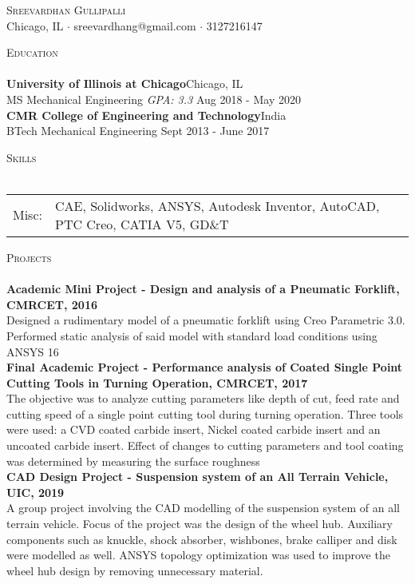 \documentclass[a4paper]{article}
\newcommand{\lineunder} {
    \vspace*{-8pt} \\
    \hspace*{-18pt} \hrulefill \\
}
\newcommand{\header} [1] {
    {\hspace*{-18pt}\vspace*{6pt} \textsc{#1}}
    \vspace*{-6pt} \lineunder
}
\begin{document}
\vspace*{-40pt}

    

\vspace*{-10pt}
\begin{center}
	{\Huge \scshape {Sreevardhan Gullipalli}}\\
	Chicago, IL $\cdot$ sreevardhang@gmail.com $\cdot$ 3127216147\\
\end{center}

\header{Education}
\textbf{University of Illinois at Chicago}\hfill Chicago, IL\\
MS Mechanical Engineering \textit{GPA: 3.3} \hfill Aug 2018 - May 2020\\
\vspace{2mm}
\textbf{CMR College of Engineering and Technology}\hfill India\\
BTech Mechanical Engineering \hfill Sept 2013 - June 2017\\
\vspace{2mm}



\header{Skills}
\begin{tabular}{ l l }
	Misc: & CAE, Solidworks, ANSYS, Autodesk Inventor, AutoCAD, PTC Creo, CATIA V5, GD\&T \\
\end{tabular}
\vspace{2mm}

\header{Projects}
{\textbf{Academic Mini Project - Design and analysis of a Pneumatic Forklift, CMRCET, 2016}}\\
Designed a rudimentary model of a pneumatic forklift using Creo Parametric 3.0. Performed static analysis of said model with standard load conditions using ANSYS 16\\
\vspace*{2mm}
{\textbf{Final Academic Project - Performance analysis of Coated Single Point Cutting Tools in Turning Operation, CMRCET, 2017}}\\
The objective was to analyze cutting parameters like depth of cut, feed rate and cutting speed of a single point cutting tool during turning operation. Three tools were used: a CVD coated carbide insert, Nickel coated carbide insert and an uncoated carbide insert. Effect of changes to cutting parameters and tool coating was determined by measuring the surface roughness\\
\vspace*{2mm}
{\textbf{CAD Design Project - Suspension system of an All Terrain Vehicle, UIC, 2019}}\\
A group project involving the CAD modelling of the suspension system of an all terrain vehicle. Focus of the project was the design of the wheel hub. Auxiliary components such as knuckle, shock absorber, wishbones, brake calliper and disk were modelled as well. ANSYS topology optimization was used to improve the wheel hub design by removing unnecessary material.\\
\vspace*{2mm}
\end{document}
